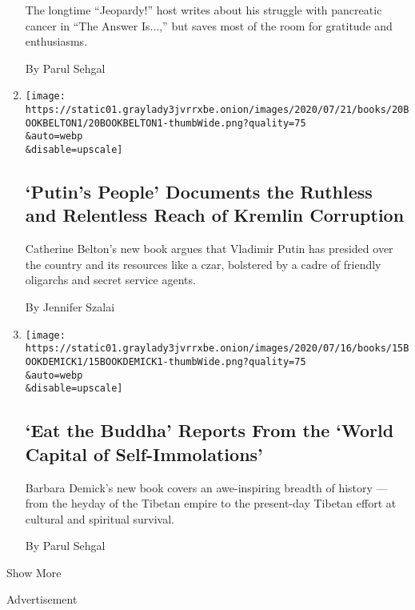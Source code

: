 \begin{enumerate}
  The longtime ``Jeopardy!'' host writes about his struggle with
  pancreatic cancer in ``The Answer Is...,'' but saves most of the room
  for gratitude and enthusiasms.

  By Parul Sehgal
\item
  \href{/2020/07/16/books/review-putins-people-kgb-catherine-belton.html}{}

  \texttt{[image: https://static01.graylady3jvrrxbe.onion/images/2020/07/21/books/20BOOKBELTON1/20BOOKBELTON1-thumbWide.png?quality=75\\\&auto=webp\\\&disable=upscale]}

  \hypertarget{putins-people-documents-the-ruthless-and-relentless-reach-of-kremlin-corruption}{%
  \subsection{`Putin's People' Documents the Ruthless and Relentless
  Reach of Kremlin
  Corruption}\label{putins-people-documents-the-ruthless-and-relentless-reach-of-kremlin-corruption}}

  Catherine Belton's new book argues that Vladimir Putin has presided
  over the country and its resources like a czar, bolstered by a cadre
  of friendly oligarchs and secret service agents.

  By Jennifer Szalai
\item
  \href{/2020/07/15/books/eat-buddha-life-death-tibetan-town-barbara-demick.html}{}

  \texttt{[image: https://static01.graylady3jvrrxbe.onion/images/2020/07/16/books/15BOOKDEMICK1/15BOOKDEMICK1-thumbWide.png?quality=75\\\&auto=webp\\\&disable=upscale]}

  \hypertarget{eat-the-buddha-reports-from-the-world-capital-of-self-immolations}{%
  \subsection{`Eat the Buddha' Reports From the `World Capital of
  Self-Immolations'}\label{eat-the-buddha-reports-from-the-world-capital-of-self-immolations}}

  Barbara Demick's new book covers an awe-inspiring breadth of history
  --- from the heyday of the Tibetan empire to the present-day Tibetan
  effort at cultural and spiritual survival.

  By Parul Sehgal
\end{enumerate}

Show More

Advertisement

